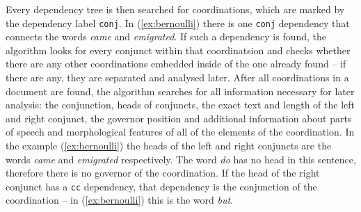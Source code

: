 Every dependency tree is then searched for coordinations, which are marked by the dependency label \texttt{conj}. In (\ref{ex:bernoulli}) there is one \texttt{conj} dependency that connects the words \textsl{came} and \textsl{emigrated}. If such a dependency is found, the algorithm looks for every conjunct within that coordinatsion and checks whether there are any other coordinations embedded inside of the one already found -- if there are any, they are separated and analysed later. After all coordinations in a document are found, the algorithm searches for all information necessary for later analysis: the conjunction, heads of conjuncts, the exact text and length of the left and right conjunct, the governor position and additional information about parts of speech and morphological features of all of the elements of the coordination. In the example (\ref{ex:bernoulli}) the heads of the left and right conjuncts are the words \textsl{came} and \textsl{emigrated} respectively. The word \textsl{do} has no head in this sentence, therefore there is no governor of the coordination. If the head of the right conjunct has a \texttt{cc} dependency, that dependency is the conjunction of the coordination -- in (\ref{ex:bernoulli}) this is the word \textsl{but}. 

